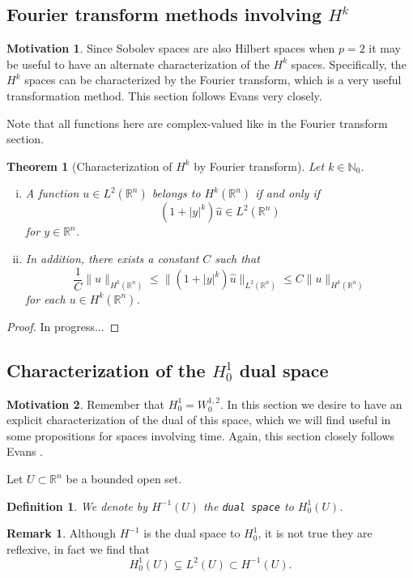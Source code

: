 \documentclass[11pt]{article}
\newtheorem{theorem}{Theorem}
\newtheorem{definition}{Definition}
\theoremstyle{definition}
\newtheorem*{remark}{Remark}
\newtheorem*{motivation}{Motivation}
\begin{document}
\newpage

\subsection{Fourier transform methods involving $H^k$}
\begin{motivation}
	Since Sobolev spaces are also Hilbert spaces when $p=2$ it may be useful to have an alternate characterization of the $H^k$ spaces.
	Specifically, the $H^k$ spaces can be characterized by the Fourier transform, which is a very useful transformation method.
	This section follows Evans \cite{evans1998partial} very closely.
\end{motivation}
Note that all functions here are complex-valued like in the Fourier transform section.
\begin{theorem}[Characterization of $H^k$ by Fourier transform]
	Let $k \in \mathbb{N}_0$.
	\begin{enumerate}[(i)]
		\item A function $u \in L^2(\mathbb{R}^n)$ belongs to $H^k(\mathbb{R}^n)$ if and only if
			\begin{equation}
				(1+|y|^k)\hat{u} \in L^2(\mathbb{R}^n)
			\end{equation}
			for $y \in \mathbb{R}^n$.
		\item In addition, there exists a constant $C$ such that
			\begin{equation}
				\frac{1}{C}\|u\|_{H^k(\mathbb{R}^n)} \leq \|(1+|y|^k)\hat{u}\|_{L^2(\mathbb{R}^n)} \leq C\|u\|_{H^k(\mathbb{R}^n)}
			\end{equation}
			for each $u \in H^k(\mathbb{R}^n)$.
	\end{enumerate}
\end{theorem}
\begin{proof}
	In progress...
\end{proof}

\newpage

\subsection{Characterization of the $H_0^1$ dual space}
\begin{motivation}
	Remember that $H_0^1 = W_0^{1,2}$. In this section we desire to have an explicit characterization of the dual of this space,
	which we will find useful in some propositions for spaces involving time. Again, this section closely follows Evans \cite{evans1998partial}.
\end{motivation}
Let $U \subset \mathbb{R}^n$ be a bounded open set.
\begin{definition}
	We denote by $H^{-1}(U)$ the \texttt{dual space} to $H_0^1(U)$.
\end{definition}
\begin{remark}
	Although $H^{-1}$ is the dual space to $H_0^1$, it is not true they are reflexive, in fact we find that
	\begin{equation*}
		H_0^1(U) \subsetneq L^2(U) \subset H^{-1}(U).
	\end{equation*}
\end{remark}
\end{document}
